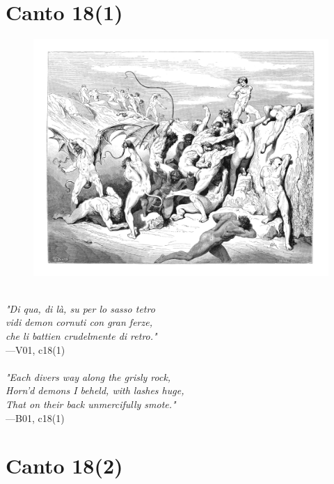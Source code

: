 \documentclass[../Dore_vision.tex]{subfiles}
\begin{document}
\newpage

\section{Canto 18(1)}

\begin{figure}[ht]
\centering
\includegraphics[height=\figsize]{illustrations/book_1/V01, c18(1).jpg}
\end{figure}

\begin{center}
\begin{minipage}{0.8\linewidth}
\textit{\\
"Di qua, di là, su per lo sasso tetro\\vidi demon cornuti con gran ferze,\\che li battien crudelmente di retro."} \\
—V01, c18(1) \\~\\
\textit{"Each divers way along the grisly rock,\\Horn'd demons I beheld, with lashes huge,\\That on their back unmercifully smote."} \\
—B01, c18(1)
\end{minipage}
\end{center}

\newpage

\section{Canto 18(2)}
\end{document}
